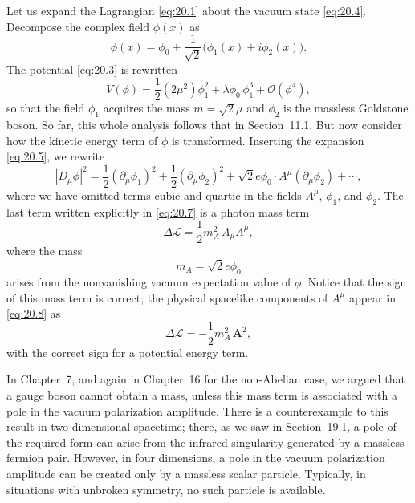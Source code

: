 Let us expand the Lagrangian \eqref{eq:20.1} about the vacuum state
\eqref{eq:20.4}.  Decompose the complex field $\phi(x)$ as
\begin{equation}
  \phi(x) = \phi_0 + \frac{1}{\sqrt{2}}\bigl( \phi_1(x) + i\phi_2(x) \bigr) .
  \label{eq:20.5}
\end{equation}
The potential \eqref{eq:20.3} is rewritten
\begin{equation}
  V(\phi) = \frac{1}{2}(2\mu^2)\phi_1^2 + \lambda\phi_0\,\phi_1^3
    + \mathcal{O}(\phi^4) ,
  \label{eq:20.6}
\end{equation}
so that the field $\phi_1$ acquires the mass $m = \sqrt{2}\mu$ and $\phi_2$ is
the massless Goldstone boson.  So far, this whole analysis follows that in
Section~11.1.  But now consider how the kinetic energy term of $\phi$ is
transformed.  Inserting the expansion \eqref{eq:20.5}, we rewrite
\begin{equation}
  |D_\mu\phi|^2 = \frac{1}{2}(\partial_\mu\phi_1)^2 + \frac{1}{2}
    (\partial_\mu\phi_2)^2 + \sqrt{2}e\phi_0\cdot A^\mu(\partial_\mu\phi_2)
      + \cdots ,
  \label{eq:20.7}
\end{equation}
where we have omitted terms cubic and quartic in the fields $A^\mu$,
$\phi_1$, and $\phi_2$.  The last term written explicitly in \eqref{eq:20.7}
is a photon mass term
\begin{equation}
  \Delta\mathcal{L} = \frac{1}{2}m_A^2\,A_\mu A^\mu ,
  \label{eq:20.8}
\end{equation}
where the mass
\begin{equation}
  m_A = \sqrt{2}e\phi_0
  \label{eq:20.9}
\end{equation}
arises from the nonvanishing vacuum expectation value of $\phi$.  Notice that
the sign of this mass term is correct; the physical spacelike components of
$A^\mu$ appear in \eqref{eq:20.8} as
\begin{equation}
  \Delta\mathcal{L} = -\frac{1}{2}m_A^2\,\mathbf{A}^2 ,
\end{equation}
with the correct sign for a potential energy term.

In Chapter~7, and again in Chapter~16 for the non-Abelian case, we argued
that a gauge boson cannot obtain a mass, unless this mass term is associated
with a pole in the vacuum polarization amplitude.  There is a counterexample
to this result in two-dimensional spacetime; there, as we saw in Section~19.1,
a pole of the required form can arise from the infrared singularity generated
by a massless fermion pair.  However, in four dimensions, a pole in the vacuum
polarization amplitude can be created only by a massless scalar particle.
Typically, in situations with unbroken symmetry, no such particle is
available.

